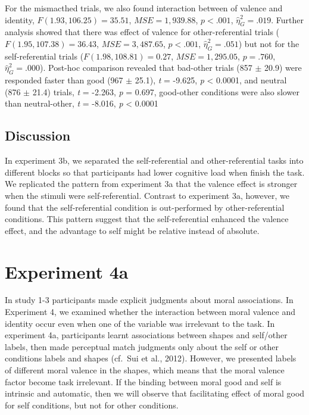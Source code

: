 \documentclass[
  english,
  man]{apa6}
\begin{document}
For the mismacthed trials, we also found interaction between of valence and identity, \(F(1.93, 106.25) = 35.51\), \(\mathit{MSE} = 1,939.88\), \(p < .001\), \(\hat{\eta}^2_G = .019\). Further analysis showed that there was effect of valence for other-referential trials (\(F(1.95, 107.38) = 36.43\), \(\mathit{MSE} = 3,487.65\), \(p < .001\), \(\hat{\eta}^2_G = .051\)) but not for the self-referential trials (\(F(1.98, 108.81) = 0.27\), \(\mathit{MSE} = 1,295.05\), \(p = .760\), \(\hat{\eta}^2_G = .000\)). Post-hoc comparison revealed that bad-other trials (857 \(\pm\) 20.9) were responded faster than good (967 \(\pm\) 25.1), \emph{t} = -9.625, \emph{p} \textless{} 0.0001, and neutral (876 \(\pm\) 21.4) trials, \emph{t} = -2.263, \emph{p} = 0.697, good-other conditions were also slower than neutral-other, \emph{t} = -8.016, \emph{p} \textless{} 0.0001

\hypertarget{discussion-3}{%
\subsection{Discussion}\label{discussion-3}}

In experiment 3b, we separated the self-referential and other-referential tasks into different blocks so that participants had lower cognitive load when finish the task. We replicated the pattern from experiment 3a that the valence effect is stronger when the stimuli were self-referential. Contrast to experiment 3a, however, we found that the self-referential condition is out-performed by other-referential conditions. This pattern suggest that the self-referential enhanced the valence effect, and the advantage to self might be relative instead of absolute.

\hypertarget{experiment-4a}{%
\section{Experiment 4a}\label{experiment-4a}}

In study 1-3 participants made explicit judgments about moral associations. In Experiment 4, we examined whether the interaction between moral valence and identity occur even when one of the variable was irrelevant to the task. In experiment 4a, participants learnt associations between shapes and self/other labels, then made perceptual match judgments only about the self or other conditions labels and shapes (cf.~Sui et al., 2012). However, we presented labels of different moral valence in the shapes, which means that the moral valence factor become task irrelevant. If the binding between moral good and self is intrinsic and automatic, then we will observe that facilitating effect of moral good for self conditions, but not for other conditions.
\end{document}
